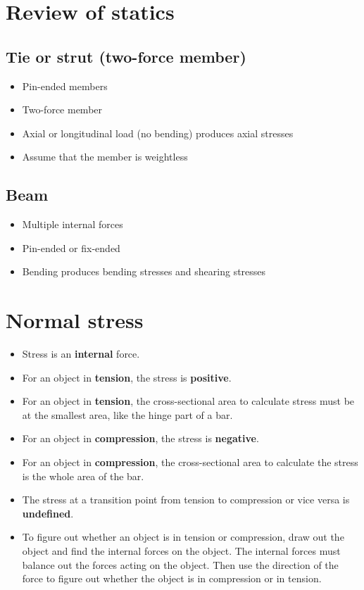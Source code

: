 \documentclass[11pt]{article}
\begin{document}
\newpage

\section{Review of statics}
\label{sec:orgfa0b4c2}

\subsection{Tie or strut (two-force member)}
\label{sec:orge4214d7}
\begin{itemize}
\item Pin-ended members
\item Two-force member
\item Axial or longitudinal load (no bending) produces axial stresses
\item Assume that the member is weightless
\end{itemize}

\subsection{Beam}
\label{sec:org3aef0d1}
\begin{itemize}
\item Multiple internal forces
\item Pin-ended or fix-ended
\item Bending produces bending stresses and shearing stresses
\end{itemize}

\newpage

\section{Normal stress}
\label{sec:orgd906144}
\begin{itemize}
\item Stress is an \textbf{internal} force.
\item For an object in \textbf{tension}, the stress is \textbf{positive}.
\item For an object in \textbf{tension}, the cross-sectional area to calculate stress must be at the smallest area, like the hinge part of a bar.
\item For an object in \textbf{compression}, the stress is \textbf{negative}.
\item For an object in \textbf{compression}, the cross-sectional area to calculate the stress is the whole area of the bar.
\item The stress at a transition point from tension to compression or vice versa is \textbf{undefined}.
\item To figure out whether an object is in tension or compression, draw out the object and find the internal forces on the object. The internal forces must balance out the forces acting on the object. Then use the direction of the force to figure out whether the object is in compression or in tension.
\end{itemize}
\end{document}
